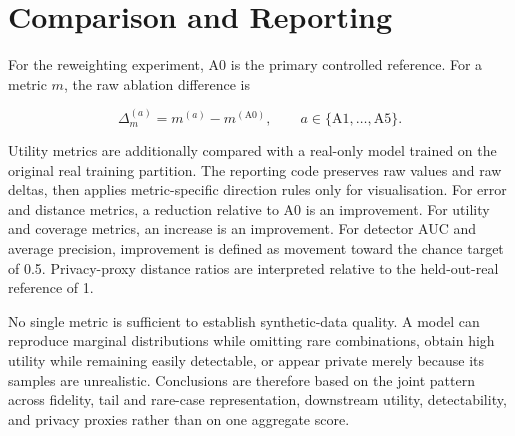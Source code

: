 \section{Comparison and Reporting}
\label{sec:evaluation_reporting}

For the reweighting experiment, A0 is the primary controlled reference. For a
metric $m$, the raw ablation difference is

\begin{equation}
    \Delta_m^{(a)} = m^{(a)}-m^{(\mathrm{A0})},
    \qquad a\in\{\mathrm{A1},\ldots,\mathrm{A5}\}.
    \label{eq:evaluation_ablation_delta}
\end{equation}

Utility metrics are additionally compared with a real-only model trained on
the original real training partition. The reporting code preserves raw values
and raw deltas, then applies metric-specific direction rules only for
visualisation. For error and distance metrics, a reduction relative to A0 is an
improvement. For utility and coverage metrics, an increase is an improvement.
For detector AUC and average precision, improvement is defined as movement
toward the chance target of 0.5. Privacy-proxy distance ratios are interpreted
relative to the held-out-real reference of 1.

No single metric is sufficient to establish synthetic-data quality. A model
can reproduce marginal distributions while omitting rare combinations, obtain
high utility while remaining easily detectable, or appear private merely
because its samples are unrealistic. Conclusions are therefore based on the
joint pattern across fidelity, tail and rare-case representation, downstream
utility, detectability, and privacy proxies rather than on one aggregate score.
